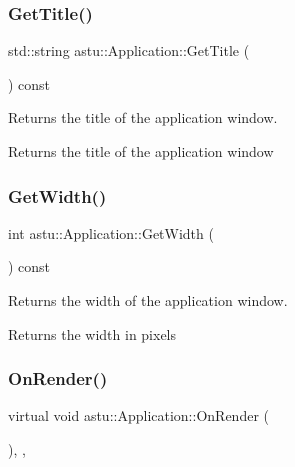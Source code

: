 \subsubsection{\texorpdfstring{Get\+Title()}{GetTitle()}}
{\footnotesize\ttfamily std\+::string astu\+::\+Application\+::\+Get\+Title (\begin{DoxyParamCaption}{ }\end{DoxyParamCaption}) const}

Returns the title of the application window.

\begin{DoxyReturn}{Returns}
the title of the application window 
\end{DoxyReturn}
\mbox{\label{classastu_1_1Application_af6f316ed892f9bf487d49d5ba1309e3f}} 
\subsubsection{\texorpdfstring{Get\+Width()}{GetWidth()}}
{\footnotesize\ttfamily int astu\+::\+Application\+::\+Get\+Width (\begin{DoxyParamCaption}{ }\end{DoxyParamCaption}) const}

Returns the width of the application window.

\begin{DoxyReturn}{Returns}
the width in pixels 
\end{DoxyReturn}
\mbox{\label{classastu_1_1Application_ae7eb0ef242caceca38890f78ddb85718}} 
\subsubsection{\texorpdfstring{On\+Render()}{OnRender()}}
{\footnotesize\ttfamily virtual void astu\+::\+Application\+::\+On\+Render (\begin{DoxyParamCaption}{ }\end{DoxyParamCaption})\hspace{0.3cm}{\ttfamily [inline]}, {\ttfamily [protected]}, {\ttfamily [virtual]}}

